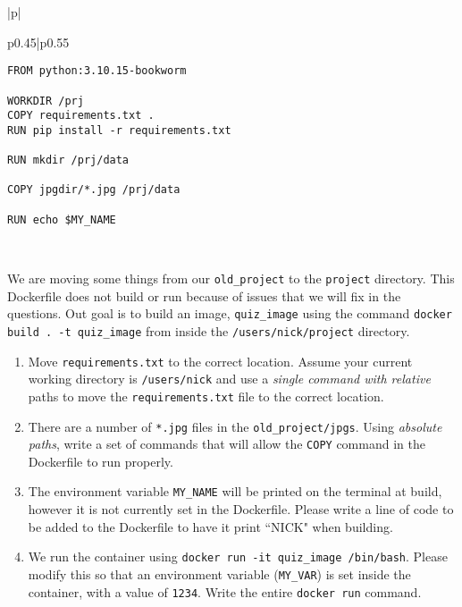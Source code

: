 \documentclass[11pt]{article}
\begin{document}
\begin{table}[h]
\begin{tabular}{|p{\textwidth}|}
\begin{tabular}{p{0.45\textwidth}|p{0.55\textwidth}}
\begin{minipage}[t]{\linewidth}
\begin{verbatim}
FROM python:3.10.15-bookworm

WORKDIR /prj
COPY requirements.txt .
RUN pip install -r requirements.txt

RUN mkdir /prj/data

COPY jpgdir/*.jpg /prj/data

RUN echo $MY_NAME
\end{verbatim}
\end{minipage}
\end{tabular} \\
\hline
\end{tabular}
\end{table}


\noindent We are moving some things from our \texttt{old\_project} to the \texttt{project} directory. This Dockerfile does not build or run because of issues that we will fix in the questions. Out goal is to build an image, \texttt{quiz\_image} using the command \mbox{\texttt{docker build . -t quiz\_image}} from inside the \texttt{/users/nick/project} directory. 

\begin{enumerate}

\item Move \texttt{requirements.txt} to the correct location. Assume your current working directory is \texttt{/users/nick} and use a \emph{single command with relative} paths to move the \texttt{requirements.txt} file to the correct location. 
\vspace{1.5cm}
\item There are a number of \texttt{*.jpg} files in the \texttt{old\_project/jpgs}. Using \emph{absolute paths}, write a set of commands that will allow the \texttt{COPY} command in the Dockerfile to run properly.
\vspace{1.5cm}
\item The environment variable \texttt{MY\_NAME} will be printed on the terminal at build, however it is not currently set in the Dockerfile. Please write a line of code to be added to the Dockerfile to have it print ``NICK" when building.
\vspace{1.5cm} 
\item We run the container using \texttt{docker run -it quiz\_image /bin/bash}. Please modify this so that an environment variable (\texttt{MY\_VAR}) is set inside the container, with a value of \texttt{1234}. Write the entire \texttt{docker run} command.


\end{enumerate}
\end{document}
